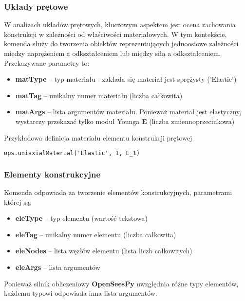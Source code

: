 \subsubsection*{Układy prętowe}

W analizach układów prętowych, kluczowym aspektem jest ocena zachowania konstrukcji w zależności od właściwości materiałowych.
W tym kontekście, komenda   służy do tworzenia obiektów reprezentujących
jednoosiowe zależności między naprężeniem a odkształceniem lub między siłą a odkształceniem.
Przekazywane parametry to:

\begin{itemize}
    \item \textbf{matType} – typ materiału - zakłada się materiał jest sprężysty ('Elastic')
    \item \textbf{matTag} – unikalny numer materiału (liczba całkowita)
    \item \textbf{matArgs} – lista argumentów materiału. Ponieważ materiał jest elastyczny, wystarczy przekazać tylko moduł Younga \textbf{E} (liczba zmiennoprzecinkowa)
\end{itemize}

Przykładowa definicja materiału elementu konstrukcji prętowej

\begin{lstlisting}
ops.uniaxialMaterial('Elastic', 1, E_1)
\end{lstlisting}

\subsubsection*{Elementy konstrukcyjne}

Komenda  odpowiada za tworzenie elementów konstrukcyjnych, parametrami której są:

\begin{itemize}
    \item \textbf{eleType} – typ elementu (wartość tekstowa)
    \item \textbf{eleTag} – unikalny numer elementu (liczba całkowita)
    \item \textbf{eleNodes} – lista węzłów elementu (lista liczb całkowitych)
    \item \textbf{eleArgs} – lista argumentów
\end{itemize}

Ponieważ silnik obliczeniowy \textbf{OpenSeesPy} uwzględnia różne typy elementów, każdemu typowi odpowiada inna lista argumentów.

